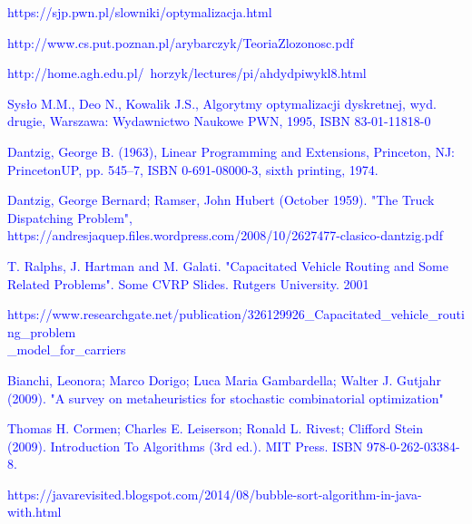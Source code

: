 \documentclass[a4paper, twoside, 12pt, justified]{article}
\begin{document}
	\newpage
	\renewcommand\refname{Źródła}
	\begin{thebibliography}{}
		{\hypertarget{optymalizacja}{\textcolor{blue}{
		https://sjp.pwn.pl/slowniki/optymalizacja.html}}}
	
		{\hypertarget{problemy}{\textcolor{blue}{
		http://www.cs.put.poznan.pl/arybarczyk/TeoriaZlozonosc.pdf}}}
	
		{\hypertarget{zlozonosc}{\textcolor{blue}{
		http://home.agh.edu.pl/~horzyk/lectures/pi/ahdydpiwykl8.html}}}

		{\hypertarget{komiwojazer}{\textcolor{blue}{
		Sysło M.M., Deo N., Kowalik J.S., Algorytmy optymalizacji dyskretnej, wyd. drugie, Warszawa: Wydawnictwo Naukowe PWN, 1995, ISBN 83-01-11818-0}}}
	
		{\hypertarget{dfj}{\textcolor{blue}{
		Dantzig, George B. (1963), Linear Programming and Extensions, Princeton, NJ: PrincetonUP, pp. 545–7, ISBN 0-691-08000-3, sixth printing, 1974.}}}
	
		{\hypertarget{vrp}{\textcolor{blue}{
		 Dantzig, George Bernard; Ramser, John Hubert (October 1959). "The Truck Dispatching Problem", https://andresjaquep.files.wordpress.com/2008/10/2627477-clasico-dantzig.pdf}}}
		
		{\hypertarget{cvrp}{\textcolor{blue}{T. Ralphs, J. Hartman and M. Galati. "Capacitated Vehicle Routing and Some Related Problems". Some CVRP Slides. Rutgers University. 2001}}}
		
		{\hypertarget{cvrp2}{\textcolor{blue}{https://www.researchgate.net/publication/326129926\_Capacitated\_vehicle\_routing\_problem\\\_model\_for\_carriers}}}
		
		{\hypertarget{metaheurystyka}{\textcolor{blue}{Bianchi, Leonora; Marco Dorigo; Luca Maria Gambardella; Walter J. Gutjahr (2009). "A survey on metaheuristics for stochastic combinatorial optimization"}}}
		
		{\hypertarget{algorithm}{\textcolor{blue}{
		Thomas H. Cormen; Charles E. Leiserson; Ronald L. Rivest; Clifford Stein (2009). Introduction To Algorithms (3rd ed.). MIT Press. ISBN 978-0-262-03384-8.}}}
	
		{\hypertarget{bubble}{\textcolor{blue}{
		https://javarevisited.blogspot.com/2014/08/bubble-sort-algorithm-in-java-with.html}}}
		

\end{thebibliography}
\end{document}
